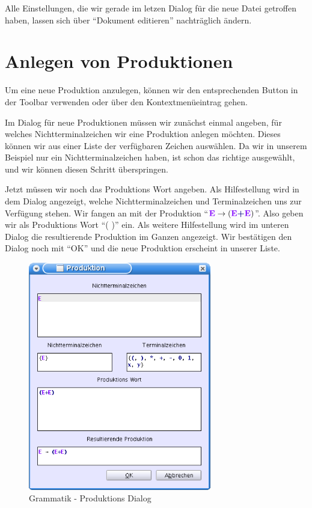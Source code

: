 Alle Einstellungen, die wir gerade im letzen Dialog für die neue Datei getroffen
haben, lassen sich über "`Dokument editieren"' nachträglich ändern.

\section{Anlegen von Produktionen}

Um eine neue Produktion anzulegen, können wir den entsprechenden Button in der
Toolbar verwenden oder über den Kontextmenüeintrag gehen.\vspace{10pt}

Im Dialog für neue Produktionen müssen wir zunächst einmal angeben, für welches
Nichtterminalzeichen wir eine Produktion anlegen möchten. Dieses können wir aus
einer Liste der verfügbaren Zeichen auswählen. Da wir in unserem Beispiel nur
ein Nichtterminalzeichen haben, ist schon das richtige ausgewählt, und wir
können diesen Schritt überspringen.\vspace{10pt}

Jetzt müssen wir noch das Produktions Wort angeben. Als Hilfestellung wird in dem
Dialog angezeigt, welche Nichtterminalzeichen und Terminalzeichen uns zur
Verfügung stehen. Wir fangen an mit der Produktion "`$\StartSymbol{E} \to
(\StartSymbol{E} \TerminalSymbol{+} \StartSymbol{E})$"'. Also geben wir als
Produktions Wort "`( \TerminalSymbol{+} )"' ein.
Als weitere Hilfestellung wird im unteren Dialog die resultierende Produktion im
Ganzen angezeigt. Wir bestätigen den Dialog noch mit "`OK"' und die neue
Produktion erscheint in unserer Liste.\vspace{10pt}

\begin{figure}[h]
\begin{center}
\includegraphics[width=8cm]{../images/production_dialog.png}
\caption{Grammatik - Produktions Dialog}
\end{center}
\end{figure}

